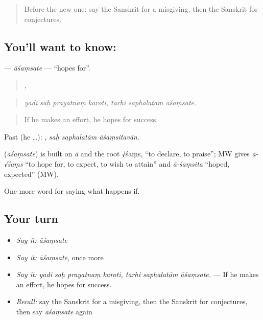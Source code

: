 \label{lesson:SA-C368-asamsate}



\begin{quote}
Before the new one: say the Sanskrit for a misgiving, then the Sanskrit for conjectures.
\end{quote}

\subsection*{You'll want to know: }
\textbf{} — \emph{āśaṃsate} — \textquotedblleft{}hopes for\textquotedblright{}.

\begin{quote}
   ,   
\end{quote}

\begin{quote}
\emph{yadi saḥ prayatnaṃ karoti, tarhi saphalatām āśaṃsate.}
\end{quote}

\begin{quote}
If he makes an effort, he hopes for success.
\end{quote}

Past (he …):   , \emph{saḥ saphalatām āśaṃsitavān}.

\begin{cousinweb}
\textbf{} (\emph{āśaṃsate}) is built on \emph{ā} and the root √śaṃs, \textquotedblleft{}to declare, to praise\textquotedblright{}; MW gives \emph{ā-√śaṃs} \textquotedblleft{}to hope for, to expect, to wish to attain\textquotedblright{} and \emph{ā-śaṃsita} \textquotedblleft{}hoped, expected\textquotedblright{} (MW).
\end{cousinweb}

\begin{grammarlens}[title={What you've built}]
One more word for saying what happens if.
\end{grammarlens}

\subsection*{Your turn}
\begin{itemize}
\raggedright
  \item \emph{Say it:} \emph{āśaṃsate}
  \item \emph{Say it:} \emph{āśaṃsate}, once more
  \item \emph{Say it:} \emph{yadi saḥ prayatnaṃ karoti, tarhi saphalatām āśaṃsate.} — If he makes an effort, he hopes for success.
  \item \emph{Recall:} say the Sanskrit for a misgiving, then the Sanskrit for conjectures, then say \emph{āśaṃsate} again
\end{itemize}


